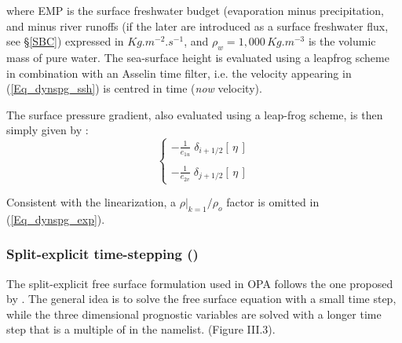 where EMP is the surface freshwater budget (evaporation minus precipitation, and minus river runoffs (if the later are introduced as a surface freshwater flux, see \S\ref{SBC}) expressed in $Kg.m^{-2}.s^{-1}$, and $\rho _w =1,000\,Kg.m^{-3}$ is the volumic mass of pure water. The sea-surface height is evaluated using a leapfrog scheme in combination with an Asselin time filter, i.e. the velocity appearing in (\ref{Eq_dynspg_ssh}) is centred in time (\textit{now} velocity). 

The surface pressure gradient, also evaluated using a leap-frog scheme, is then simply given by :
\begin{equation} \label{Eq_dynspg_exp}
\left\{ \begin{aligned}
 - \frac{1}    						{e_{1u}} \;	\delta _{i+1/2} \left[  \,\eta\,  \right] 	\\
 \\
 - \frac{1}    						{e_{2v}} \;	\delta _{j+1/2} \left[  \,\eta\,  \right]  
\end{aligned} \right.
\end{equation} 

Consistent with the linearization, a $\left. \rho \right|_{k=1} / \rho _o$ factor is omitted in (\ref{Eq_dynspg_exp}). 

\subsubsection{Split-explicit time-stepping ()}
\label{DYN_spg_ts}
The split-explicit free surface formulation used in OPA follows the one proposed by \citet{Griffies2004}. The general idea is to solve the free surface equation with a small time step, while the three dimensional prognostic variables are solved with a longer time step that is a multiple of 
in the   namelist. 
(Figure III.3). 


